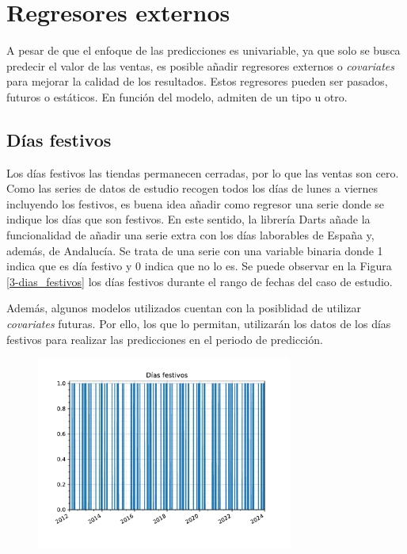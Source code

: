 \section{Regresores externos}

A pesar de que el enfoque de las predicciones es univariable, ya que solo se busca predecir el valor de las ventas, es posible añadir regresores externos o \textit{covariates} para mejorar la calidad de los resultados. Estos regresores pueden ser pasados, futuros o estáticos. En función del modelo, admiten de un tipo u otro.

\subsection{Días festivos}

Los días festivos las tiendas permanecen cerradas, por lo que las ventas son cero. Como las series de datos de estudio recogen todos los días de lunes a viernes incluyendo los festivos, es buena idea añadir como regresor una serie donde se indique los días que son festivos. En este sentido, la librería Darts añade la funcionalidad de añadir una serie extra con los días laborables de España y, además, de Andalucía. Se trata de una serie con una variable binaria donde 1 indica que es día festivo y 0 indica que no lo es. Se puede observar en la Figura \ref*{3-dias_festivos} los días festivos durante el rango de fechas del caso de estudio.

Además, algunos modelos utilizados cuentan con la posiblidad de utilizar \textit{covariates} futuras. Por ello, los que lo permitan, utilizarán los datos de los días festivos para realizar las predicciones en el periodo de predicción.

\begin{figure}[H]
	{\includegraphics[width=0.75\textwidth]{imagenes/grafica_holidays.pdf}}
\end{figure}

